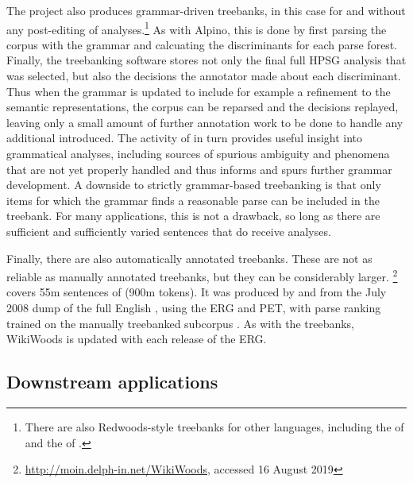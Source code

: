 \documentclass[output=paper,nonflat]{langsci/langscibook}
\begin{document}
The  project \citep{OFTM2004a-u} also produces grammar-driven
treebanks, in this case for  and without any post-editing of
analyses.\footnote{There are also Redwoods-style treebanks for other
  languages, including the  of 
  \citep{bond:etal:2004} and the  of 
  \citep{marimon:2015}.}  As with Alpino, this is done by first
parsing the corpus with the grammar and calcuating the discriminants
for each parse forest.  Finally, the treebanking software stores not
only the final full HPSG analysis that was selected, but also the
decisions the annotator made about each discriminant. Thus when the
grammar is updated to include for example a refinement to the semantic
representations, the corpus can be reparsed and the decisions
replayed, leaving only a small amount of further annotation work to be
done to handle any additional  introduced. The activity of
 in turn provides useful insight into grammatical analyses,
including sources of spurious ambiguity and phenomena that are not yet
properly handled and thus informs and spurs further grammar
development.  A downside to strictly grammar-based treebanking is that
only items for which the grammar finds a reasonable parse can be
included in the treebank. For many applications, this is not a
drawback, so long as there are sufficient and sufficiently varied
sentences that do receive analyses.

Finally, there are also automatically annotated treebanks.
These are not as reliable as manually annotated treebanks,
but they can be considerably larger.
\footnote{\url{http://moin.delph-in.net/WikiWoods}, accessed 16 August 2019}
covers 55m sentences of  (900m tokens).
It was produced by \citet{flickinger2010wikiwoods} and \citet{solberg2012wikiwoods}
from the July 2008 dump of the full English ,
using the ERG and PET,
with parse ranking trained on the manually treebanked subcorpus  \citep{ytrestol2009wescience}.
As with the  treebanks, WikiWoods is updated with each release of the ERG.





\subsection{Downstream applications}
\label{cl:downstream}
\end{document}

